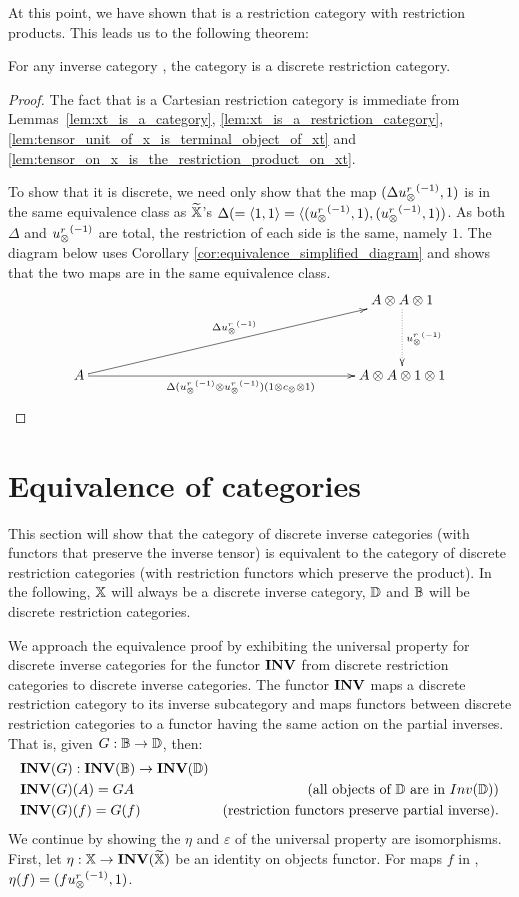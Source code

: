 
At this point, we have shown that \Xt is a restriction category with restriction products. This
leads us to the following theorem:

\begin{theorem}\label{thm:xt_is_a_discrete_crc_when_x_is_an_inverse_category}
  For any inverse category \X, the category \Xt is a discrete restriction category.
\end{theorem}
\begin{proof}
  The fact that \Xt is a Cartesian restriction category is immediate from
  Lemmas~\ref{lem:xt_is_a_category}, \ref{lem:xt_is_a_restriction_category},
  \ref{lem:tensor_unit_of_x_is_terminal_object_of_xt} and
  \ref{lem:tensor_on_x_is_the_restriction_product_on_xt}.

  To show that it is discrete, we need only show that the map $(\Delta {\ensuremath{u_{\otimes}^r}}^{(-1)},1)$ is in the
  same equivalence class as $\widetilde{\mathbb{X}}$'s $\Delta(= \langle1,1\rangle = \langle({u_{\otimes}^r}^{(-1)},1),({u_{\otimes}^r}^{(-1)},1))$. As both
  $\Delta$ and ${u_{\otimes}^r}^{(-1)}$ are total, the restriction of each side is the same, namely $1$. The
  diagram below uses Corollary \ref{cor:equivalence_simplified_diagram} and shows that the two maps
  are in the same equivalence class.
  \[
    \xymatrix @C=190pt @R=40pt{
      & A \* A \* 1 \ar@{.>}[d]^{\inv{\usr}}\\
      A \ar[ur]^{\Delta\inv{\usr}}
        \ar[r]_{\Delta(\inv{\usr}\*\inv{\usr})(1\*c_{\*}\*1)}& A\*A\*1\*1
    }
  \]
\end{proof}
\section{Equivalence of categories} %
\label{sec:equivalence_of_categories}

This section will show that the category of discrete inverse categories (with functors that preserve
the inverse tensor) is equivalent to the category of discrete restriction categories (with
restriction functors which preserve the product). In the following, $\mathbb{X}$
will always be a discrete inverse category, $\mathbb{D}$ and $\mathbb{B}$ will be discrete restriction categories.

We approach the equivalence proof by exhibiting the universal property for discrete inverse
categories for the functor $\mathbf{INV}$ from discrete restriction categories to discrete inverse
categories. The functor $\mathbf{INV}$ maps a discrete restriction category to its inverse subcategory and
maps functors between discrete restriction categories to a functor having the same action on the
partial inverses. That is, given $G:\mathbb{B} \to \mathbb{D}$, then:
\begin{align*}
  &\mathbf{INV}({G}): \mathbf{INV}({\mathbb{B}}) \to \mathbf{INV}({\mathbb{D}})\\
  &\mathbf{INV}({G})(A) = G{A}&\text{(all objects of $\mathbb{D}$ are in $Inv(\mathbb{D})$)}\\
  &\mathbf{INV}({G})(f) = G(f)&\text{(restriction functors preserve partial inverse)}.
\end{align*}
We continue by showing the $\eta$ and $\varepsilon$ of the universal property are isomorphisms.
First, let $\eta:\mathbb{X} \to \mathbf{INV}({\widetilde{\mathbb{X}}})$ be an identity on objects functor. For maps $f$ in \X, $\eta(f)
= (f{u_{\otimes}^r}^{(-1)},1)$.

